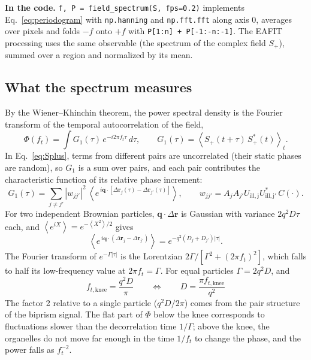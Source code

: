 \documentclass[11pt,a4paper]{article}
\newcommand{\vr}{\mathbf{r}}
\newcommand{\vq}{\mathbf{q}}
\newcommand{\ee}{e}
\newcommand{\dd}{d}
\newcommand{\avg}[1]{\left\langle #1 \right\rangle}
\newcommand{\code}[1]{\texttt{\small #1}}
\newcommand{\incode}[1]{\par\smallskip\noindent\colorbox{black!6}{\parbox{\dimexpr\linewidth-2\fboxsep}{\small\textbf{In the code.} #1}}\par\smallskip}
\begin{document}
\incode{\code{f, P = field\_spectrum(S, fps=0.2)} implements
Eq.~\eqref{eq:periodogram} with \code{np.hanning} and \code{np.fft.fft} along
axis 0, averages over pixels and folds $-f$ onto $+f$ with
\code{P[1:n] + P[-1:-n:-1]}. The EAFIT processing \cite[Eqs.~2.33--2.36]{lopez2026}
uses the same observable (the spectrum of the complex field $S_+$), summed
over a region and normalized by its mean.}

\subsection{What the spectrum measures}
\label{sec:theory}

By the Wiener--Khinchin theorem, the power spectral density is the Fourier
transform of the temporal autocorrelation of the field,
\begin{equation}
  \Phi(f_t) = \int G_1(\tau)\,\ee^{-i2\pi f_t\tau}\,\dd\tau,
  \qquad
  G_1(\tau) = \avg{S_+(t+\tau)\,S_+^*(t)}_t .
\end{equation}
In Eq.~\eqref{eq:Splus}, terms from different pairs are uncorrelated (their
static phases are random), so $G_1$ is a sum over pairs, and each pair
contributes the characteristic function of its relative phase increment:
\begin{equation}
  G_1(\tau) = \sum_{j\ne j'} |w_{jj'}|^2\,
  \avg{\ee^{\,i\vq\cdot[\Delta\vr_j(\tau)-\Delta\vr_{j'}(\tau)]}},
  \qquad w_{jj'} = A_jA_{j'}U_\mathrm{ill,j}U^*_\mathrm{ill,j'}\,C(\cdot).
\end{equation}
For two independent Brownian particles, $\vq\cdot\Delta\vr$ is Gaussian with
variance $2q^2D\tau$ each, and $\avg{\ee^{iX}} = \ee^{-\avg{X^2}/2}$ gives
\begin{equation}
  \avg{\ee^{\,i\vq\cdot(\Delta\vr_j-\Delta\vr_{j'})}} = \ee^{-q^2(D_j+D_{j'})|\tau|} .
\end{equation}
The Fourier transform of $\ee^{-\Gamma|\tau|}$ is the Lorentzian
$2\Gamma/[\Gamma^2+(2\pi f_t)^2]$, which falls to half its low-frequency value
at $2\pi f_t = \Gamma$. For equal particles $\Gamma = 2q^2D$, and
\begin{equation}
  \boxed{\;f_{t,\mathrm{knee}} = \frac{q^2D}{\pi}
  \qquad\Longleftrightarrow\qquad D = \frac{\pi f_{t,\mathrm{knee}}}{q^2}\;}
  \label{eq:knee}
\end{equation}
The factor 2 relative to a single particle ($q^2D/2\pi$) comes from the pair
structure of the biprism signal. The flat part of $\Phi$ below the knee
corresponds to fluctuations slower than the decorrelation time
$1/\Gamma$; above the knee, the organelles do not move far enough in the
time $1/f_t$ to change the phase, and the power falls as $f_t^{-2}$.
\end{document}
